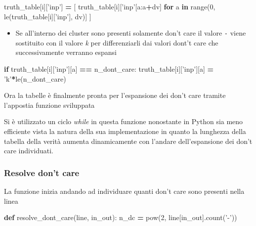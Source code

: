 \documentclass[italian,]{book}
\newenvironment{Shaded}{\begin{snugshade}}{\end{snugshade}}
\newcommand{\BuiltInTok}[1]{#1}
\newcommand{\ControlFlowTok}[1]{\textcolor[rgb]{0.13,0.29,0.53}{\textbf{#1}}}
\newcommand{\DecValTok}[1]{\textcolor[rgb]{0.00,0.00,0.81}{#1}}
\newcommand{\KeywordTok}[1]{\textcolor[rgb]{0.13,0.29,0.53}{\textbf{#1}}}
\newcommand{\NormalTok}[1]{#1}
\newcommand{\OperatorTok}[1]{\textcolor[rgb]{0.81,0.36,0.00}{\textbf{#1}}}
\newcommand{\StringTok}[1]{\textcolor[rgb]{0.31,0.60,0.02}{#1}}
\providecommand{\tightlist}{%
  \setlength{\itemsep}{0pt}\setlength{\parskip}{0pt}}
\begin{document}
\begin{Shaded}
\begin{Highlighting}[]
\NormalTok{truth_table[i][}\StringTok{'inp'}\NormalTok{] }\OperatorTok{=}\NormalTok{ [}
\NormalTok{   truth_table[i][}\StringTok{'inp'}\NormalTok{[a:a}\OperatorTok{+}\NormalTok{dv]}
   \ControlFlowTok{for}\NormalTok{ a }\KeywordTok{in} \BuiltInTok{range}\NormalTok{(}\DecValTok{0}\NormalTok{, le(truth_table[i][}\StringTok{'inp'}\NormalTok{], dv)]}
\NormalTok{ ]}
\end{Highlighting}
\end{Shaded}

\begin{itemize}
\tightlist
\item
  Se all'interno dei cluster sono presenti solamente don't care il valore \texttt{-} viene sostituito con il valore \emph{k} per differenziarli dai valori dont't care che successivamente verranno espansi
\end{itemize}

\begin{Shaded}
\begin{Highlighting}[]
\ControlFlowTok{if}\NormalTok{ truth_table[i][}\StringTok{'inp'}\NormalTok{][a] }\OperatorTok{==}\NormalTok{ n_dont_care:}
\NormalTok{  truth_table[i][}\StringTok{'inp'}\NormalTok{][a] }\OperatorTok{=} \StringTok{'k'}\OperatorTok{*}\NormalTok{le(n_dont_care)}
\end{Highlighting}
\end{Shaded}

Ora la tabelle è finalmente pronta per l'espansione dei don't care tramite l'appostia funzione sviluppata

Si è utilizzato un ciclo \emph{while} in questa funzione nonostante in Python sia meno efficiente vista la natura della sua implementazione in quanto la lunghezza della tabella della verità aumenta dinamicamente con l'andare dell'espansione dei don't care individuati.

\hypertarget{resolve-dont-care}{%
\subsubsection{Resolve don't care}\label{resolve-dont-care}}

La funzione inizia andando ad individuare quanti don't care sono presenti nella linea

\begin{Shaded}
\begin{Highlighting}[]
\KeywordTok{def}\NormalTok{ resolve_dont_care(line, in_out):}
\NormalTok{  n_dc }\OperatorTok{=} \BuiltInTok{pow}\NormalTok{(}\DecValTok{2}\NormalTok{, line[in_out].count(}\StringTok{'-'}\NormalTok{))}
\end{Highlighting}
\end{Shaded}
\end{document}
